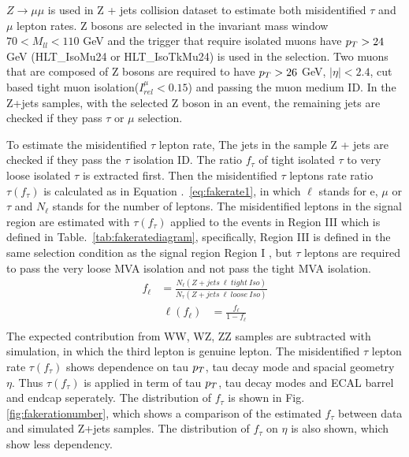 $Z\rightarrow\mu\mu$ is used in Z + jets collision dataset to estimate both misidentified $\tau$ and $\mu$ lepton rates. Z bosons are selected in the invariant mass window $70<M_{ll}<110$ GeV and the trigger that require isolated muons have $p_{T}>24$ GeV (HLT\_IsoMu24 or HLT\_IsoTkMu24) is used in the selection. Two muons that are composed of Z bosons are required to have $p_{T}>26$ GeV, $|\eta|<2.4$, cut based tight muon isolation($I^{\mu}_{rel}<0.15$) and passing the muon medium ID. In the Z+jets samples, with the selected Z boson in an event, the remaining jets are checked if they pass $\tau$ or $\mu$ selection.

To estimate the misidentified $\tau$ lepton rate, The jets in the sample Z + jets are checked if they pass the $\tau$ isolation ID. The ratio $f_{\tau}$ of tight isolated $\tau$ to very loose isolated $\tau$ is extracted first. Then the misidentified $\tau$ leptons rate ratio $\tau(f_{\tau})$ is calculated as in Equation .~\ref{eq:fakerate1}, in which $\ell$ stands for e, $\mu$ or $\tau$ and $N_{\ell}$ stands for the number of leptons. The misidentified leptons in the signal region are estimated with $\tau(f_{\tau})$ applied to the events in Region III which is defined in Table.~\ref{tab:fakeratediagram}, specifically, Region III is defined in the same selection condition as the signal region Region I , but  $\tau$ leptons are required to pass the very loose MVA isolation and not pass the tight MVA isolation.
\begin{align} 
f_{\ell}&=\frac{N_{\ell}(Z+jets\ \ell \ tight\ Iso)}{N_{\tau}(Z+jets\ \ell \ loose\ Iso)} \label{eq:fakerate2}
\end{align}
\begin{align}
\ell(f_{\ell})&=\frac{f_{\ell}}{1-f_{\ell}} \label{eq:fakerate1}\\
\end{align}
The expected contribution from WW, WZ, ZZ samples are subtracted with simulation, in which the third lepton is genuine lepton. The misidentified $\tau$ lepton rate $\tau(f_{\tau})$ shows dependence on tau $p_{T}$, tau decay mode and spacial geometry $\eta$. Thus $\tau(f_{\tau})$ is applied in term of tau $p_{T}$, tau decay modes and ECAL barrel and endcap seperately. The distribution of $f_{\tau}$ is shown in Fig.~ \ref{fig:fakerationumber}, which shows a comparison of the estimated $f_{\tau}$ between data and simulated Z+jets samples. The distribution of $f_{\tau}$ on $\eta$ is also shown, which show less dependency. 

